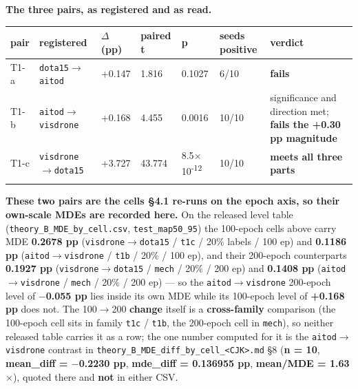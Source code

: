 \documentclass[pdflatex,sn-mathphys-ay]{sn-jnl}
\begin{document}
\textbf{The three pairs, as registered and as read.}

{\footnotesize
\setlength{\tabcolsep}{4pt}
\begin{longtable}{p{}p{}p{}p{}p{}p{}p{}}
\toprule
pair & registered & \ensuremath{\Delta} (pp) & paired t & p & seeds positive & verdict \\
\midrule
\endhead
T1-a & \texttt{dota15\ensuremath{\rightarrow}aitod} & +0.147 & 1.816 & 0.1027 & 6/10 & \textbf{fails} \\
T1-b & \texttt{aitod\ensuremath{\rightarrow}visdrone} & +0.168 & 4.455 & 0.0016 & 10/10 & significance and direction met; \textbf{fails the +0.30 pp magnitude} \\
T1-c & \texttt{visdrone\ensuremath{\rightarrow}dota15} & +3.727 & 43.774 & 8.5\ensuremath{\times}10\textsuperscript{-12} & 10/10 & \textbf{meets all three parts} \\
\botrule
\end{longtable}}

\textbf{These two pairs are the cells \S{}4.1 re-runs on the epoch axis, so their own-scale MDEs are recorded here.} On the released level table (\texttt{theory\_B\_MDE\_by\_cell.csv}, \texttt{test\_map50\_95}) the 100-epoch cells above carry MDE \textbf{0.2678 pp} (\texttt{visdrone\ensuremath{\rightarrow}dota15} / \texttt{t1c} / 20\% labels / 100 ep) and \textbf{0.1186 pp} (\texttt{aitod\ensuremath{\rightarrow}visdrone} / \texttt{t1b} / 20\% / 100 ep), and their 200-epoch counterparts \textbf{0.1927 pp} (\texttt{visdrone\ensuremath{\rightarrow}dota15} / \texttt{mech} / 20\% / 200 ep) and \textbf{0.1408 pp} (\texttt{aitod\ensuremath{\rightarrow}visdrone} / \texttt{mech} / 20\% / 200 ep) --- so the \texttt{aitod\ensuremath{\rightarrow}visdrone} 200-epoch level of \textbf{\ensuremath{-}0.055 pp} lies inside its own MDE while its 100-epoch level of \textbf{+0.168 pp} does not. The 100\ensuremath{\rightarrow}200 \textbf{change} itself is a \textbf{cross-family} comparison (the 100-epoch cell sits in family \texttt{t1c} / \texttt{t1b}, the 200-epoch cell in \texttt{mech}), so neither released table carries it as a row; the one number computed for it is the \texttt{aitod\ensuremath{\rightarrow}visdrone} contrast in \texttt{theory\_B\_MDE\_diff\_by\_cell\_<CJK>.md} \S{}8 (\textbf{n = 10}, \textbf{mean\_diff = \ensuremath{-}0.2230 pp}, \textbf{mde\_diff = 0.136955 pp}, \textbf{\textbar{}mean\textbar{}/MDE = 1.63\ensuremath{\times}}), quoted there and \textbf{not} in either CSV.
\end{document}
